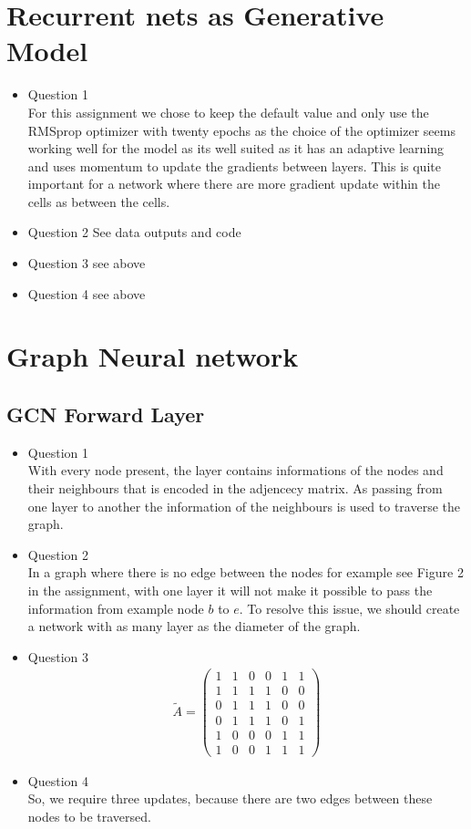\documentclass{article}
\begin{document}
\section{Recurrent nets as Generative Model}

\begin{itemize}
  \item Question 1 \\
  For this assignment we chose to keep the default value and only use the RMSprop optimizer with twenty epochs as the choice of the optimizer seems working well for the model as its well suited as it has an adaptive learning and uses momentum to update the gradients between layers. This is quite important for a network where there are more gradient update within the cells as between the cells.  
  \item Question 2 See data outputs and code
  \item Question 3 see above
  \item Question 4 see above
\end{itemize}

\section{Graph Neural network}

\subsection{GCN Forward Layer}
\begin{itemize}
  \item Question 1 \\
  With every node present, the layer contains informations of the nodes and their neighbours that is encoded in the adjencecy matrix. As passing from one layer to another the information of the neighbours is used to traverse the graph. 
  \item Question 2 \\
  In a graph where there is no edge between the nodes for example see Figure 2 in the assignment, with one layer it will not make it possible to pass the information from example node $b$ to $e$. To resolve this issue, we should create a network with as many layer as the diameter of the graph. 
  \item Question 3
  \begin{align*}
  \tilde{A}= \left(\begin{matrix}1&1&0&0&1&1\\1&1&1&1&0&0\\0&1&1&1&0&0\\0&1&1&1&0&1\\1&0&0&0&1&1\\1&0&0&1&1&1\end{matrix}\right)
  \end{align*}
  \item Question 4 \\
  So, we require three updates, because there are two edges between these nodes to be traversed. 
\end{itemize}
\end{document}
